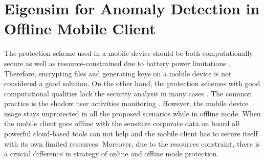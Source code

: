 \chapter{Eigensim for Anomaly Detection in Offline Mobile Client}
\label{ch:3_mobile}


The protection scheme used in a mobile device should be both computationally secure as well as resource-constrained due to battery power limitations \cite{khan2015cloud}. Therefore, encrypting files and generating keys on a mobile device is not considered a good solution. On the other hand, the protection schemes with good computational qualities lack the security analysis in many cases \cite{khan2014bss}. The common practice is the shadow user activities monitoring \cite{yovel2014}. However, the mobile device usage stays unprotected in all the proposed scenarios while in offline mode. When the mobile client goes offline with the sensitive corporate data on board all powerful cloud-based tools can not help and the mobile client has to secure itself with its own limited resources. Moreover, due to the resources constraint, there is a crucial difference in strategy of online and offline mode protection.

